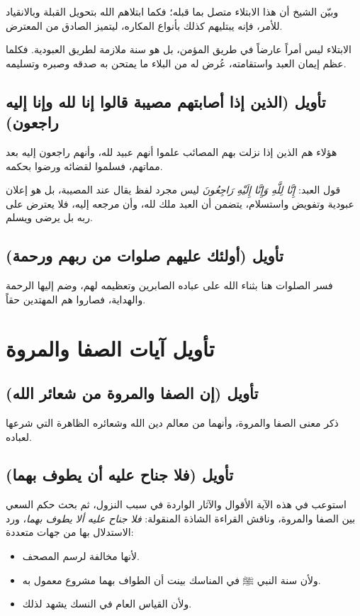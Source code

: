 وبيّن الشيخ أن هذا الابتلاء متصل بما قبله؛ فكما ابتلاهم الله بتحويل القبلة وبالانقياد للأمر، فإنه يبتليهم كذلك بأنواع المكاره، ليتميز الصادق من المعترض.

\begin{fawaid}
الابتلاء ليس أمراً عارضاً في طريق المؤمن، بل هو سنة ملازمة لطريق العبودية. فكلما عظم إيمان العبد واستقامته، عُرض له من البلاء ما يمتحن به صدقه وصبره وتسليمه.
\end{fawaid}

\subsection{تأويل (الذين إذا أصابتهم مصيبة قالوا إنا لله وإنا إليه راجعون)}
 هؤلاء هم الذين إذا نزلت بهم المصائب علموا أنهم عبيد لله، وأنهم راجعون إليه بعد مماتهم، فسلموا لقضائه ورضوا بحكمه.

\begin{fawaid}
قول العبد: \textit{إِنَّا لِلَّهِ وَإِنَّا إِلَيْهِ رَاجِعُونَ} ليس مجرد لفظ يقال عند المصيبة، بل هو إعلان عبودية وتفويض واستسلام، يتضمن أن العبد ملك لله، وأن مرجعه إليه، فلا يعترض على ربه بل يرضى ويسلم.
\end{fawaid}

\subsection{تأويل (أولئك عليهم صلوات من ربهم ورحمة)}
فسر  الصلوات هنا بثناء الله على عباده الصابرين وتعظيمه لهم، وضم إليها الرحمة والهداية، فصاروا هم المهتدين حقاً.

\separator

\section{تأويل آيات الصفا والمروة}
\subsection{تأويل (إن الصفا والمروة من شعائر الله)}
ذكر  معنى الصفا والمروة، وأنهما من معالم دين الله وشعائره الظاهرة التي شرعها لعباده.

\subsection{تأويل (فلا جناح عليه أن يطوف بهما)}
استوعب  في هذه الآية الأقوال والآثار الواردة في سبب النزول، ثم بحث حكم السعي بين الصفا والمروة، وناقش القراءة الشاذة المنقولة: \textit{فلا جناح عليه ألا يطوف بهما}، ورد الاستدلال بها من جهات متعددة:
\begin{itemize}
    \item لأنها مخالفة لرسم المصحف.
    \item ولأن سنة النبي ﷺ في المناسك بينت أن الطواف بهما مشروع معمول به.
    \item ولأن القياس العام في النسك يشهد لذلك.
\end{itemize}

